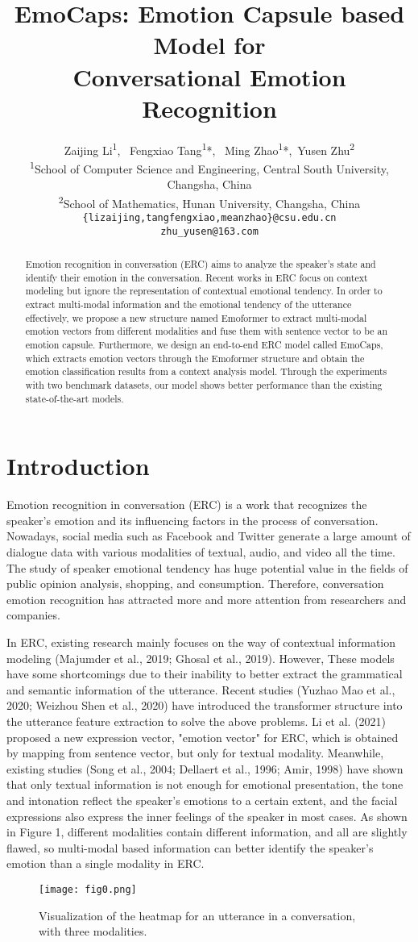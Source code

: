 \documentclass[11pt]{article}
\title{EmoCaps: Emotion Capsule based Model for\\ 
	Conversational Emotion Recognition}
\author{Zaijing Li\textsuperscript{1}, \ Fengxiao Tang\textsuperscript{1}*, \  Ming Zhao\textsuperscript{1}*,\ Yusen Zhu\textsuperscript{2}
	\\ \textsuperscript{1}School of Computer Science and Engineering, Central South University, Changsha, China \\ \textsuperscript{2}School of Mathematics, Hunan University, Changsha, China \\ \texttt{\{lizaijing,tangfengxiao,meanzhao\}@csu.edu.cn} \\ \texttt{zhu\_yusen@163.com}}
\begin{document}
\maketitle
\begin{abstract}
	Emotion recognition in conversation (ERC) aims to analyze the speaker's state and identify their emotion in the conversation. Recent works in ERC focus on context modeling but ignore the representation of contextual emotional tendency. In order to extract multi-modal information and the emotional tendency of the utterance effectively, we propose a new structure named Emoformer to extract multi-modal emotion vectors from different modalities and fuse them with sentence vector to be an emotion capsule. Furthermore, we design an end-to-end ERC model called EmoCaps, which extracts emotion vectors through the Emoformer structure and obtain the emotion classification results from a context analysis model. Through the experiments with two benchmark datasets, our model shows better performance than the existing state-of-the-art models.
\end{abstract}
\section{Introduction}
Emotion recognition in conversation (ERC) is a work that recognizes the speaker's emotion and its influencing factors in the process of conversation. Nowadays, social media such as Facebook and Twitter generate a large amount of dialogue data with various modalities of textual, audio, and video all the time. The study of speaker emotional tendency has huge potential value in the fields of public opinion analysis, shopping, and consumption. Therefore, conversation emotion recognition has attracted more and more attention from researchers and companies. 

In ERC, existing research mainly focuses on the way of contextual information modeling (Majumder et al., 2019; Ghosal et al., 2019). However, These models have some shortcomings due to their inability to better extract the grammatical and semantic information of the utterance. Recent studies (Yuzhao Mao et al., 2020; Weizhou Shen et al., 2020) have introduced the transformer structure into the utterance feature extraction to solve the above problems. Li et al. (2021) proposed a new expression vector, "emotion vector" for ERC, which is obtained by mapping from sentence vector, but only for textual modality. Meanwhile, existing studies (Song et al., 2004; Dellaert et al., 1996; Amir, 1998) have shown that only textual information is not enough for emotional presentation, the tone and intonation reflect the speaker’s emotions to a certain extent, and the facial expressions also express the inner feelings of the speaker in most cases. As shown in Figure 1, different modalities contain different information, and all are slightly flawed, so multi-modal based information can better identify the speaker's emotion than a single modality in ERC. 
\begin{figure}[t]
	\centering
	\texttt{[image: fig0.png]} 
	\caption{Visualization of the heatmap for an utterance in a conversation, with three modalities.}
	\label{fig0}
\end{figure}
\end{document}
